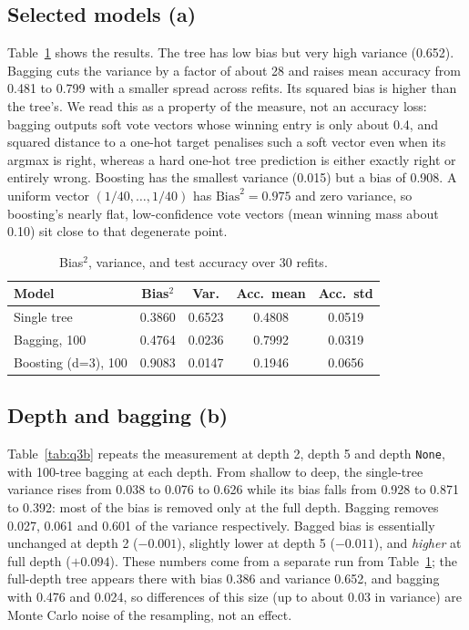 \documentclass[10pt,twocolumn,letterpaper]{article}
\begin{document}
\subsection{Selected models (a)}
Table~\ref{tab:q3a} shows the results. The tree has low bias but very high variance (0.652). Bagging cuts the variance by a factor of about 28 and raises mean accuracy from 0.481 to 0.799 with a smaller spread across refits. Its squared bias is higher than the tree's. We read this as a property of the measure, not an accuracy loss: bagging outputs soft vote vectors whose winning entry is only about 0.4, and squared distance to a one-hot target penalises such a soft vector even when its argmax is right, whereas a hard one-hot tree prediction is either exactly right or entirely wrong. Boosting has the smallest variance (0.015) but a bias of 0.908. A uniform vector $(1/40,\dots,1/40)$ has $\mathrm{Bias}^2=0.975$ and zero variance, so boosting's nearly flat, low-confidence vote vectors (mean winning mass about 0.10) sit close to that degenerate point.

\begin{table}[t]
\centering\small
\setlength{\tabcolsep}{3.5pt}
\begin{tabular}{@{}lcccc@{}}
\toprule
Model & Bias$^2$ & Var. & Acc.\ mean & Acc.\ std\\
\midrule
Single tree & 0.3860 & 0.6523 & 0.4808 & 0.0519\\
Bagging, 100 & 0.4764 & 0.0236 & 0.7992 & 0.0319\\
Boosting (d=3), 100 & 0.9083 & 0.0147 & 0.1946 & 0.0656\\
\bottomrule
\end{tabular}
\caption{Bias$^2$, variance, and test accuracy over 30 refits.}
\label{tab:q3a}
\end{table}

\subsection{Depth and bagging (b)}
Table~\ref{tab:q3b} repeats the measurement at depth 2, depth 5 and depth \texttt{None}, with 100-tree bagging at each depth. From shallow to deep, the single-tree variance rises from 0.038 to 0.076 to 0.626 while its bias falls from 0.928 to 0.871 to 0.392: most of the bias is removed only at the full depth. Bagging removes 0.027, 0.061 and 0.601 of the variance respectively. Bagged bias is essentially unchanged at depth 2 ($-0.001$), slightly lower at depth 5 ($-0.011$), and \emph{higher} at full depth ($+0.094$). These numbers come from a separate run from Table~\ref{tab:q3a}; the full-depth tree appears there with bias 0.386 and variance 0.652, and bagging with 0.476 and 0.024, so differences of this size (up to about 0.03 in variance) are Monte Carlo noise of the resampling, not an effect.
\end{document}

